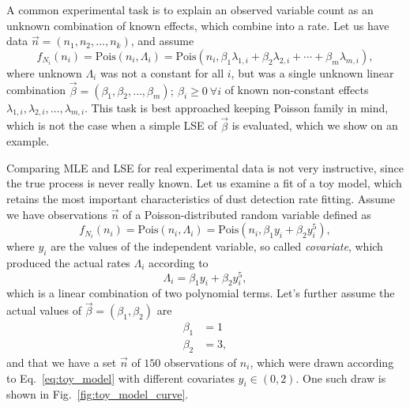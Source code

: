 A common experimental task is to explain an observed variable count as an unknown combination of known effects, which combine into a rate. Let us have data $\vec{n} = (n_1, n_2, \dots , n_k)$, and assume
\begin{equation}
    f_{N_i}(n_i) = \mathrm{Pois}(n_i,\Lambda_i) = \mathrm{Pois}(n_i,\beta_1 \lambda_{1,i} + \beta_2 \lambda_{2,i} + \cdots + \beta_m \lambda_{m,i}), \label{eq:linear_comination_model}
\end{equation}
where unknown $\Lambda_i$ was not a constant for all $i$, but was a single unknown linear combination $\vec{\beta} = (\beta_1, \beta_2, \dots, \beta_m); \ \beta_i \geq 0 \ \forall i$ of known non-constant effects $\lambda_{1,i}, \lambda_{2,i}, \dots, \lambda_{m,i}$. This task is best approached keeping Poisson family in mind, which is not the case when a simple LSE of $\vec{\beta}$ is evaluated, which we show on an example. 

Comparing MLE and LSE for real experimental data is not very instructive, since the true process is never really known. Let us examine a fit of a toy model, which retains the most important characteristics of dust detection rate fitting. Assume we have observations $\vec{n}$ of a Poisson-distributed random variable defined as
\begin{equation}
    f_{N_i}(n_i) = \mathrm{Pois}(n_i,\Lambda_i) = \mathrm{Pois}(n_i,\beta_1 y_i + \beta_2 y_i^5), \label{eq:toy_model}
\end{equation}
where $y_i$ are the values of the independent variable, so called \textit{covariate}, which produced the actual rates $\Lambda_i$ according to
\begin{equation}
    \Lambda_i = \beta_1 y_i + \beta_2 y_i^5, \label{eq:toy_model_rate}
\end{equation}
which is a linear combination of two polynomial terms. Let's further assume the actual values of $\vec{\beta} = (\beta_1,\beta_2)$ are
\begin{equation}\begin{split}
    \beta_1 &= 1 \\
    \beta_2 &= 3, \label{eq:toy_beta_values}
\end{split}\end{equation}
and that we have a set $\vec{n}$ of $150$ observations of $n_i$, which were drawn according to Eq.~\ref{eq:toy_model} with different covariates $y_i\in(0,2)$. One such draw is shown in Fig.~\ref{fig:toy_model_curve}. 

